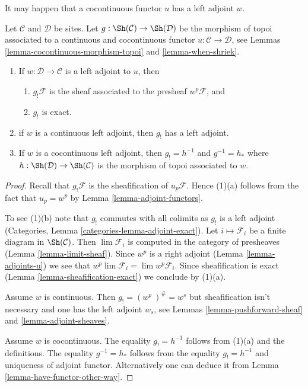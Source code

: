 \noindent
It may happen that a cocontinuous functor $u$ has a left adjoint $w$.

\begin{lemma}
\label{lemma-have-left-adjoint}
Let $\mathcal{C}$ and $\mathcal{D}$ be sites. Let
$g : \Sh(\mathcal{C}) \to \Sh(\mathcal{D})$ be
the morphism of topoi associated to a continuous and cocontinuous functor
$u : \mathcal{C} \to \mathcal{D}$, see
Lemmas \ref{lemma-cocontinuous-morphism-topoi} and
\ref{lemma-when-shriek}.
\begin{enumerate}
\item If $w : \mathcal{D} \to \mathcal{C}$ is a left adjoint to $u$, then
\begin{enumerate}
\item $g_!\mathcal{F}$ is the sheaf associated to the presheaf
$w^p\mathcal{F}$, and
\item $g_!$ is exact.
\end{enumerate}
\item if $w$ is a continuous left adjoint, then $g_!$
has a left adjoint.
\item If $w$ is a cocontinuous left adjoint, then $g_! = h^{-1}$ and
$g^{-1} = h_*$ where $h : \Sh(\mathcal{D}) \to \Sh(\mathcal{C})$ is
the morphism of topoi associated to $w$.
\end{enumerate}
\end{lemma}

\begin{proof}
Recall that $g_!\mathcal{F}$ is the sheafification of $u_p\mathcal{F}$.
Hence (1)(a) follows from the fact that $u_p = w^p$ by
Lemma \ref{lemma-adjoint-functors}.

\medskip\noindent
To see (1)(b) note that $g_!$ commutes with all colimits as $g_!$
is a left adjoint (Categories, Lemma \ref{categories-lemma-adjoint-exact}).
Let $i \mapsto \mathcal{F}_i$ be a finite diagram in $\Sh(\mathcal{C})$.
Then $\lim \mathcal{F}_i$ is computed in the category of presheaves
(Lemma \ref{lemma-limit-sheaf}). Since $w^p$ is a right adjoint
(Lemma \ref{lemma-adjoints-u})
we see that $w^p \lim \mathcal{F}_i = \lim w^p\mathcal{F}_i$. Since
sheafification is exact
(Lemma \ref{lemma-sheafification-exact})
we conclude by (1)(a).

\medskip\noindent
Assume $w$ is continuous. Then $g_! = (w^p\ )^\# = w^s$ but sheafification
isn't necessary and one has the left adjoint $w_s$, see
Lemmas \ref{lemma-pushforward-sheaf} and \ref{lemma-adjoint-sheaves}.

\medskip\noindent
Assume $w$ is cocontinuous. The equality $g_! = h^{-1}$ follows from (1)(a)
and the definitions. The equality $g^{-1} = h_*$ follows from the equality
$g_! = h^{-1}$ and uniqueness of adjoint functor. Alternatively one can deduce
it from Lemma \ref{lemma-have-functor-other-way}.
\end{proof}









